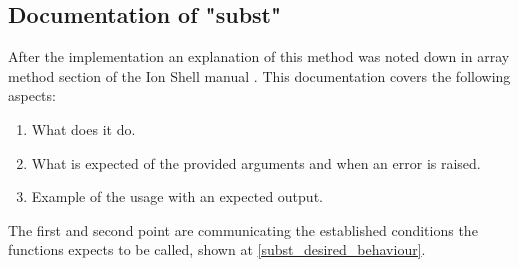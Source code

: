 \subsection{Documentation of "subst"}

After the implementation an explanation of this method was noted down in array method section of the Ion Shell manual \cite{ion_manual_array_methods}.
This documentation covers the following aspects:
\begin{enumerate}
	\item What does it do.
	\item What is expected of the provided arguments and when an error is raised.
	\item Example of the usage with an expected output.
\end{enumerate}

The first and second point are communicating the established conditions the functions expects to be called, shown at \ref{subst_desired_behaviour}.


